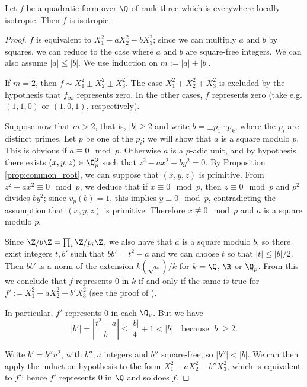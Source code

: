 \begin{lemma}\label{lem:isotr_of_rk_three}
	\leanok
	Let $f$ be a quadratic form over $\Q$ of rank three which is everywhere locally isotropic. Then $f$ is isotropic.
\end{lemma}
\begin{proof}
$f$ is equivalent to $X_1^2 - a X_2^2 - b X_3^2$; since we can multiply $a$ and $b$ by squares, we can reduce to the case where $a$ and $b$ are square-free integers. We can also assume $|a| \le |b|$. We use induction on $m := |a| + |b|$.

If $m = 2$, then $f \sim X_1^2 \pm X_2^2 \pm X_3^2$. The case $X_1^2 + X_2^2 + X_3^2$ is excluded by the hypothesis that $f_\infty$ represents zero. In the other cases, $f$ represents zero (take e.g. $(1, 1, 0)$ or $(1, 0, 1)$, respectively).

Suppose now that $m > 2$, that is, $|b| \ge 2$ and write $b = \pm p_1 \cdots p_k$, where the $p_i$ are distinct primes. Let $p$ be one of the $p_i$; we will show that $a$ is a square modulo $p$. This is obvious if $a \equiv 0 \mod p$. Otherwise $a$ is a $p$-adic unit, and by hypothesis there exists $(x, y, z) \in \Q_p^3$ such that $z^2 - ax^2 - by^2 = 0$. By Proposition \ref{prop:common_root}, we can suppose that $(x, y, z)$ is primitive.
From $z^2 - a x^2 \equiv 0 \mod p$, we deduce that if $x \equiv 0 \mod p$, then $z \equiv 0 \mod p$ and $p^2$ divides $by^2$; since $v_p(b) = 1$, this implies $y \equiv 0 \mod p$, contradicting the assumption that $(x, y, z)$ is primitive. Therefore $x \not\equiv 0 \mod p$ and $a$ is a square modulo $p$.

Since $\Z / b\Z = \prod_i \Z / p_i \Z$, we also have that $a$ is a square modulo $b$, so there exist integers $t, b'$ such that $bb' = t^2 - a$ and we can choose $t$ so that $|t| \le |b|/2$. Then $bb'$ is a norm of the extension $k(\sqrt{a})/k$ for $k = \Q$, $\R$ or $\Q_p$. From this we conclude that $f$ represents $0$ in $k$ if and only if the same is true for $f' := X_1^2 - a X_2^2 - b' X_3^2$ (see the proof of \cite[\S III.1.1, Proposition 1]{Ser73}).

In particular, $f'$ represents $0$ in each $\Q_v$. But we have
\[ |b'| = \left | \frac{t^2 - a}{b} \right | \le \frac{|b|}{4} + 1 < |b| \quad \text{because } |b| \ge 2.  \]

Write $b' = b'' u^2$, with $b'', u$ integers and $b''$ square-free, so $|b''| < |b|$. We can then apply the induction hypothesis to the form $X_1^2 - a X_2^2 - b'' X_3^2$, which is equivalent to $f'$; hence $f'$ represents $0$ in $\Q$ and so does $f$.
\end{proof}

